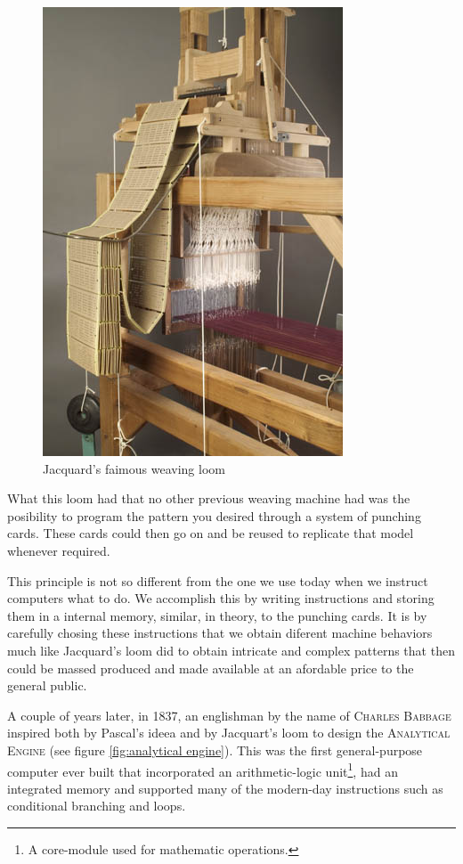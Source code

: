 \documentclass[12pt, a4paper]{book}
\newcommand{\InsertProperName}[1]{
  \textsc{#1}
}
\begin{document}
\begin{figure}[h]
  \centering
  \includegraphics[scale=0.5]{./img/altele/jacquard_loom.jpg}
  \caption{Jacquard's faimous weaving loom}
  \label{fig:jacquard}
\end{figure}

What this loom had that no other previous weaving machine had was the posibility to program the pattern you desired through a system of punching cards. These cards could then go on and be reused to replicate that model whenever required.

This principle is not so different from the one we use today when we instruct computers what to do. We accomplish this by writing instructions and storing them in a internal memory, similar, in theory, to the punching cards. It is by carefully chosing these instructions that we obtain diferent machine behaviors much like Jacquard's loom did to obtain intricate and complex patterns that then could be massed produced and made available at an afordable price to the general public.

A couple of years later, in 1837, an englishman by the name of \InsertProperName{Charles Babbage} inspired both by Pascal's ideea and by Jacquart's loom to design the \InsertProperName{Analytical Engine} (see figure \ref{fig:analytical engine}). This was the first general-purpose computer ever built that incorporated an arithmetic-logic unit\footnote{A core-module used for mathematic operations.}, had an integrated memory and supported many of the modern-day instructions such as conditional branching and loops.
\end{document}
